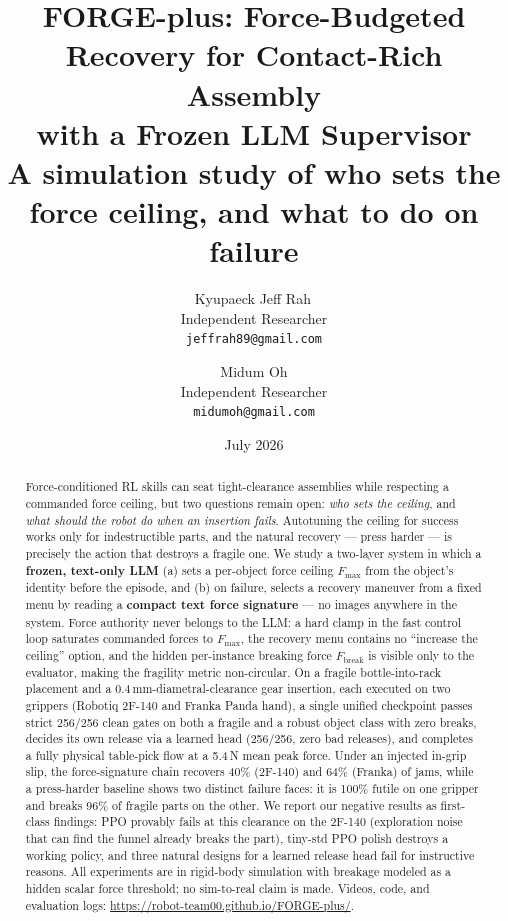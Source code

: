 \documentclass[11pt]{article}
\title{\textbf{FORGE-plus: Force-Budgeted Recovery for Contact-Rich Assembly\\ with a Frozen LLM Supervisor}\\[6pt]
\large A simulation study of who sets the force ceiling, and what to do on failure}
\author{%
Kyupaeck Jeff Rah\,\orcidlink{0000-0003-1898-2930}\\
\normalsize Independent Researcher\\
\normalsize\texttt{jeffrah89@gmail.com}
\and
Midum Oh\\
\normalsize Independent Researcher\\
\normalsize\texttt{midumoh@gmail.com}}
\date{July 2026}
\newcommand{\Fmax}{\ensuremath{F_{\max}}}
\newcommand{\Fbreak}{\ensuremath{F_{\mathrm{break}}}}
\begin{document}
\maketitle

\begin{abstract}
Force-conditioned RL skills can seat tight-clearance assemblies while respecting a commanded force ceiling, but two questions remain open: \emph{who sets the ceiling}, and \emph{what should the robot do when an insertion fails}. Autotuning the ceiling for success works only for indestructible parts, and the natural recovery --- press harder --- is precisely the action that destroys a fragile one. We study a two-layer system in which a \textbf{frozen, text-only LLM} (a) sets a per-object force ceiling \Fmax{} from the object's identity before the episode, and (b) on failure, selects a recovery maneuver from a fixed menu by reading a \textbf{compact text force signature} --- no images anywhere in the system. Force authority never belongs to the LLM: a hard clamp in the fast control loop saturates commanded forces to \Fmax{}, the recovery menu contains no ``increase the ceiling'' option, and the hidden per-instance breaking force \Fbreak{} is visible only to the evaluator, making the fragility metric non-circular. On a fragile bottle-into-rack placement and a 0.4\,mm-diametral-clearance gear insertion, each executed on two grippers (Robotiq 2F-140 and Franka Panda hand), a single unified checkpoint passes strict 256/256 clean gates on both a fragile and a robust object class with zero breaks, decides its own release via a learned head (256/256, zero bad releases), and completes a fully physical table-pick flow at a 5.4\,N mean peak force. Under an injected in-grip slip, the force-signature chain recovers 40\% (2F-140) and 64\% (Franka) of jams, while a press-harder baseline shows two distinct failure faces: it is 100\% futile on one gripper and breaks 96\% of fragile parts on the other. We report our negative results as first-class findings: PPO provably fails at this clearance on the 2F-140 (exploration noise that can find the funnel already breaks the part), tiny-std PPO polish destroys a working policy, and three natural designs for a learned release head fail for instructive reasons. All experiments are in rigid-body simulation with breakage modeled as a hidden scalar force threshold; no sim-to-real claim is made. Videos, code, and evaluation logs: \url{https://robot-team00.github.io/FORGE-plus/}.
\end{abstract}
\end{document}
